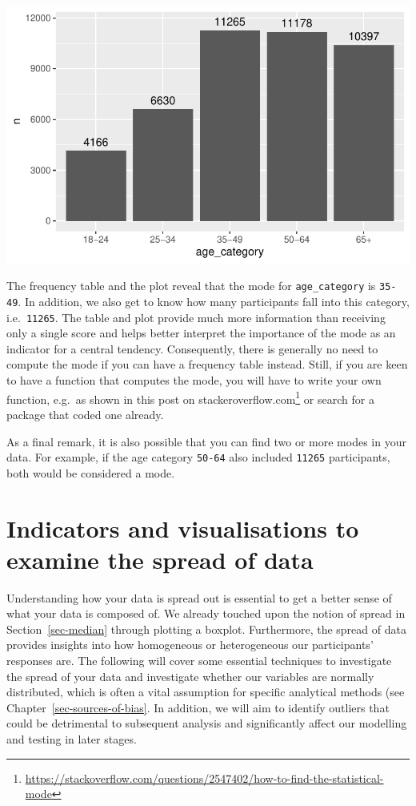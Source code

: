 \documentclass[
  letterpaper,
]{krantz}
\renewcommand{\href}[2]{#2\footnote{\url{#1}}}
\begin{document}
\includegraphics{08_descriptive_statistics_files/figure-pdf/mode-visualised-as-freq-table-1.pdf}

The frequency table and the plot reveal that the mode for
\texttt{age\_category} is \texttt{35-49}. In addition, we also get to
know how many participants fall into this category, i.e.~\texttt{11265}.
The table and plot provide much more information than receiving only a
single score and helps better interpret the importance of the mode as an
indicator for a central tendency. Consequently, there is generally no
need to compute the mode if you can have a frequency table instead.
Still, if you are keen to have a function that computes the mode, you
will have to write your own function, e.g.~as shown in this post on
\href{https://stackoverflow.com/questions/2547402/how-to-find-the-statistical-mode}{stackeroverflow.com}
or search for a package that coded one already.

As a final remark, it is also possible that you can find two or more
modes in your data. For example, if the age category \texttt{50-64} also
included \texttt{11265} participants, both would be considered a mode.

\section{Indicators and visualisations to examine the spread of
data}\label{sec-spread-of-data}

Understanding how your data is spread out is essential to get a better
sense of what your data is composed of. We already touched upon the
notion of spread in Section~\ref{sec-median} through plotting a boxplot.
Furthermore, the spread of data provides insights into how homogeneous
or heterogeneous our participants' responses are. The following will
cover some essential techniques to investigate the spread of your data
and investigate whether our variables are normally distributed, which is
often a vital assumption for specific analytical methods (see
Chapter~\ref{sec-sources-of-bias}. In addition, we will aim to identify
outliers that could be detrimental to subsequent analysis and
significantly affect our modelling and testing in later stages.
\end{document}
